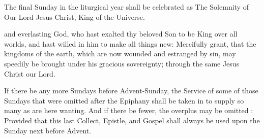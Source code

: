 \begin{rubric}
The final Sunday in the liturgical year shall be celebrated as The Solemnity of Our Lord Jesus Christ, King of the Universe.
\end{rubric}

 and everlasting God, who hast exalted thy beloved Son to be King over all worlds, and hast willed in him to make all things new: Mercifully grant, that the kingdoms of the earth, which are now wounded and estranged by sin, may speedily be brought under his gracious sovereignty; through the same Jesus Christ our Lord.

\begin{rubric}
If there be any more Sundays before Advent-Sunday, the Service of some of those Sundays that were omitted after the Epiphany shall be taken in to supply so many as are here wanting.
And if there be fewer, the overplus may be omitted : Provided that this last Collect, Epistle, and Gospel shall always be used upon the Sunday next before Advent.
\end{rubric}
